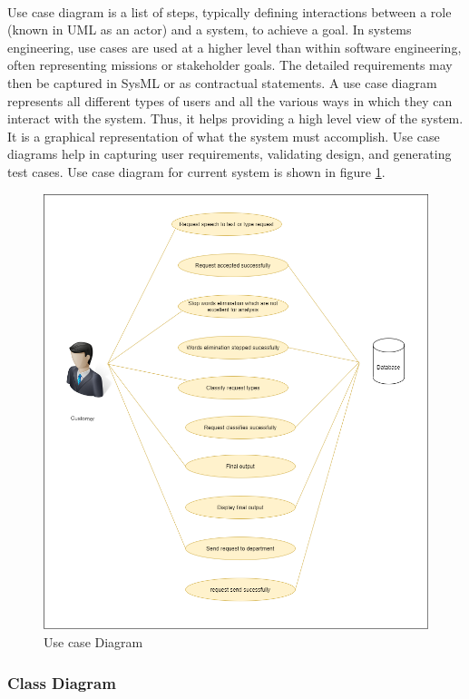 \paragraph{}Use case diagram is a list of steps, typically defining interactions between a role (known in UML as an actor) and a system, to achieve a goal. In systems engineering, use cases are used at a higher level than within software engineering, often representing missions or stakeholder goals. The detailed requirements may then be captured in
SysML or as contractual statements. A use case diagram represents all different types of users and all the various ways in which they can interact with the system. Thus, it helps providing a high level view of the system. It is a graphical representation of what the system must accomplish. Use case diagrams help in capturing user requirements, validating design, and generating test cases. Use case diagram for current system is shown in figure \ref{fig:Usecase}.
\vspace{.25in}
\begin{figure}[!h]
\centering
\includegraphics[width=.85\linewidth]{./usecase}
\caption{Use case Diagram}
\label{fig:Usecase}
\end{figure}

\subsubsection{Class Diagram}
